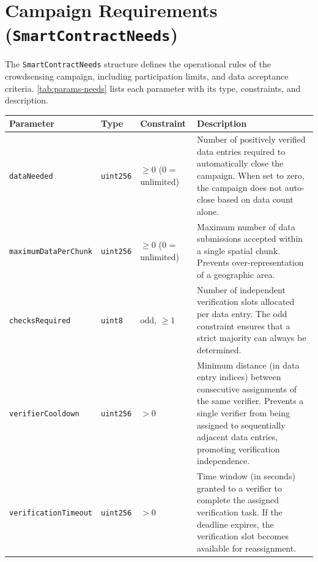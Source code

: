 \section{Campaign Requirements (\texttt{SmartContractNeeds})}\label{sec:appendix-a-needs}
The \texttt{SmartContractNeeds} structure defines the operational rules of the crowdsensing campaign, including participation limits, and data acceptance criteria.
\ref{tab:params-needs} lists each parameter with its type, constraints, and description.
\begin{table}
    \begin{tabular}{p{3.8cm} l p{1.8cm} p{8.3cm}}
        \hline
        \textbf{Parameter} & \textbf{Type} & \textbf{Constraint} & \textbf{Description} \\
        \hline
        \texttt{dataNeeded}
        & \texttt{uint256}
        & $\geq 0$ (0 = unlimited)
        & Number of positively verified data entries required to automatically close the campaign.
        When set to zero, the campaign does not auto-close based on data count alone. \\[6pt]

        \texttt{maximumDataPerChunk}
        & \texttt{uint256}
        & $\geq 0$ (0 = unlimited)
        & Maximum number of data submissions accepted within a single spatial chunk.
        Prevents over-representation of a geographic area. \\[6pt]

        \texttt{checksRequired}
        & \texttt{uint8}
        & odd, $\geq 1$
        & Number of independent verification slots allocated per data entry.
        The odd constraint ensures that a strict majority can always be determined. \\[6pt]

        \texttt{verifierCooldown}
        & \texttt{uint256}
        & $> 0$
        & Minimum distance (in data entry indices) between consecutive assignments of the same verifier.
        Prevents a single verifier from being assigned to sequentially adjacent data entries, promoting verification independence. \\[6pt]

        \texttt{verificationTimeout}
        & \texttt{uint256}
        & $> 0$
        & Time window (in seconds) granted to a verifier to complete the assigned verification task.
        If the deadline expires, the verification slot becomes available for reassignment. \\[6pt]


\end{tabular}
\end{table}
